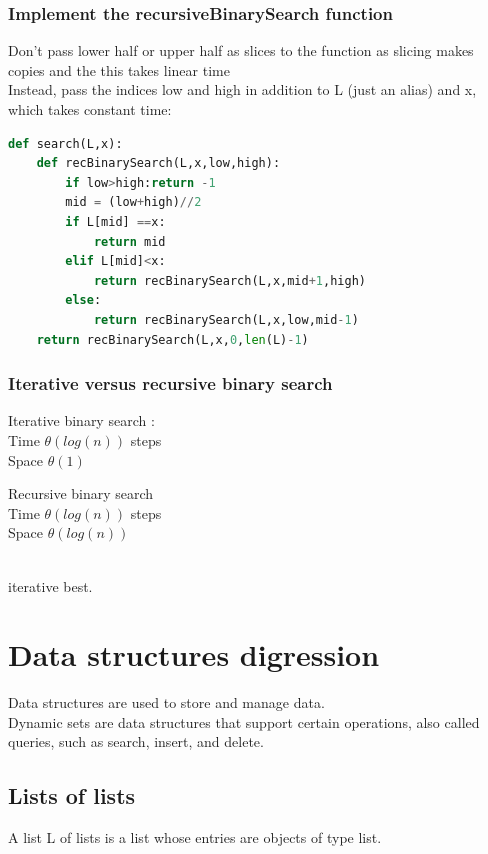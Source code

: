 \documentclass[12pt,oneside]{book}
\begin{document}
\subsection{Implement the recursiveBinarySearch function}
Don’t pass lower half or upper half as slices to the function as slicing makes copies and the this takes linear time \\
Instead, pass the indices low and high in addition to L (just an alias) and x, which takes constant time:
{\small\begin{lstlisting}[language=python]
def search(L,x):
    def recBinarySearch(L,x,low,high):
        if low>high:return -1
        mid = (low+high)//2
        if L[mid] ==x:
            return mid 
        elif L[mid]<x:
            return recBinarySearch(L,x,mid+1,high)
        else:
            return recBinarySearch(L,x,low,mid-1)
    return recBinarySearch(L,x,0,len(L)-1)

\end{lstlisting}}
\subsection{Iterative versus recursive binary search}

\begin{minipage}{0.5\linewidth}
	Iterative binary search :\\
	Time $\theta(log(n))$ steps \\
	Space $\theta(1)$
\end{minipage}
\begin{minipage}{0.5\linewidth}
	Recursive binary search \\
	Time $\theta(log(n))$ steps \\
	Space $\theta(log(n))$
\end{minipage}\\
iterative best.

\chapter{Data structures digression}
Data structures are used to store and manage data.\\
Dynamic sets are data structures that support certain operations, also called queries, such as search, insert, and delete.
\section{Lists of lists}
A list L of lists is a list whose entries are objects of type list.\\
\end{document}
